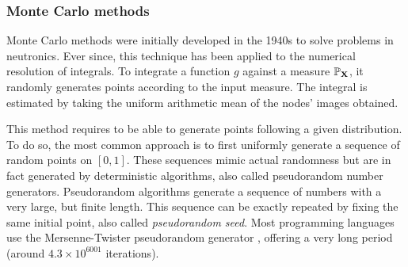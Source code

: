 \subsubsection{Monte Carlo methods}
Monte Carlo methods were initially developed in the 1940s to solve problems in neutronics.  
Ever since, this technique has been applied to the numerical resolution of integrals. 
To integrate a function $g$ against a measure $\mathbb{P}_{{\bf X}}$, it randomly generates points according to the input measure. 
The integral is estimated by taking the uniform arithmetic mean of the nodes' images obtained. 

This method requires to be able to generate points following a given distribution. 
To do so, the most common approach is to first uniformly generate a sequence of random points on $[0, 1]$. 
These sequences mimic actual randomness but are in fact generated by deterministic algorithms, also called pseudorandom number generators. 
Pseudorandom algorithms generate a sequence of numbers with a very large, but finite length. 
This sequence can be exactly repeated by fixing the same initial point, also called \textit{pseudorandom seed}.
Most programming languages use the Mersenne-Twister pseudorandom generator \citep{matsumoto_1998}, offering a very long period (around $4.3\times10^{6001}$ iterations).

